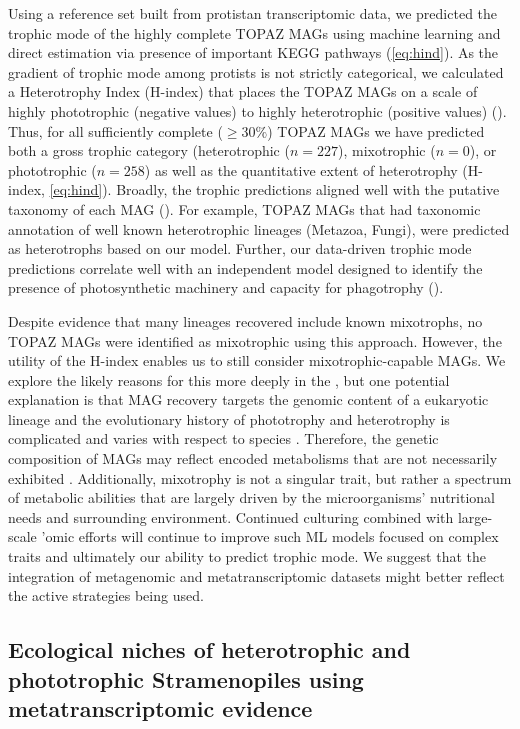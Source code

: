 \documentclass[12pt]{article}
\numberwithin{equation}{section}
\begin{document}
Using a reference set built from protistan transcriptomic data, we predicted the trophic mode of the highly complete TOPAZ MAGs using machine learning and direct estimation via presence of important KEGG pathways (\cref{eq:hind}). As the gradient of trophic mode among protists is not strictly categorical, we calculated a Heterotrophy Index (H-index) that places the TOPAZ MAGs on a scale of highly phototrophic (negative values) to highly heterotrophic (positive values) (). Thus, for all sufficiently complete ($\geq30\%$) TOPAZ MAGs we have predicted both a gross trophic category (heterotrophic ($n=227$), mixotrophic ($n=0$), or phototrophic ($n=258$) as well as the quantitative extent of heterotrophy (H-index, \cref{eq:hind}). Broadly, the trophic predictions aligned well with the putative taxonomy of each MAG (). For example, TOPAZ MAGs that had taxonomic annotation of well known heterotrophic lineages (Metazoa, Fungi),  were predicted as heterotrophs based on our model.  Further, our data-driven trophic mode predictions correlate well with an independent model designed to identify the presence of photosynthetic machinery and capacity for phagotrophy \citep{burns2018gene} (). 

Despite evidence that many lineages recovered include known mixotrophs, no TOPAZ MAGs were identified as mixotrophic using this approach. However, the utility of the H-index enables us to still consider mixotrophic-capable MAGs. We explore the likely reasons for this more deeply in the , but one potential explanation is that MAG recovery targets the genomic content of a eukaryotic lineage and the evolutionary history of phototrophy and heterotrophy is complicated and varies with respect to species \citep{Flynn_2019}. Therefore, the genetic composition of MAGs may reflect encoded metabolisms that are not necessarily exhibited . Additionally, mixotrophy is not a singular trait, but rather a spectrum of metabolic abilities that are largely driven by the microorganisms' nutritional needs and surrounding environment. Continued culturing combined with large-scale 'omic efforts will continue to improve such ML models focused on complex traits and ultimately our ability to predict trophic mode. We suggest that the integration of metagenomic and metatranscriptomic datasets might better reflect the active strategies being used. 

\subsection*{Ecological niches of heterotrophic and phototrophic Stramenopiles using metatranscriptomic evidence}
\end{document}
